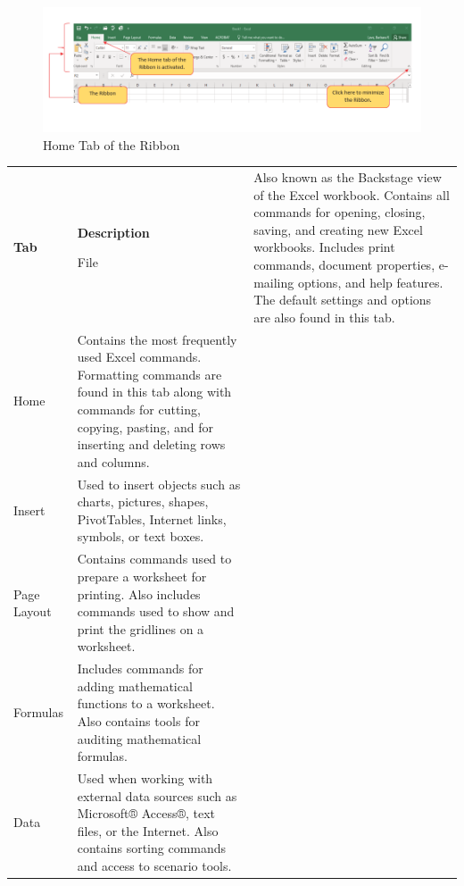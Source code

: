 \begin{figure}[H]
	\centering
	\includegraphics[width=\maxwidth{.95\linewidth}]{gfx/ch01_fig06}
	\caption{Home Tab of the Ribbon}
	\label{01:fig06}
\end{figure}

\begin{table}[H]
	{\small
		\begin{longtable}{L{0.75in}L{3.50in}} %
			\textbf{Tab} & \textbf{Description} \endhead
			\hline

			File & Also known as the Backstage view of the Excel workbook. Contains all commands for opening, closing, saving, and creating new Excel workbooks. Includes print commands, document properties, e-mailing options, and help features. The default settings and options are also found in this tab.\\

			Home & Contains the most frequently used Excel commands. Formatting commands are found in this tab along with commands for cutting, copying, pasting, and for inserting and deleting rows and columns.\\
			
			Insert & Used to insert objects such as charts, pictures, shapes, PivotTables, Internet links, symbols, or text boxes.\\
			
			Page Layout & Contains commands used to prepare a worksheet for printing. Also includes commands used to show and print the gridlines on a worksheet.\\
			
			Formulas & Includes commands for adding mathematical functions to a worksheet. Also contains tools for auditing mathematical formulas.\\
			
			Data & Used when working with external data sources such as Microsoft® Access®, text files, or the Internet. Also contains sorting commands and access to scenario tools.\\
			

\end{longtable}}
\end{table}
